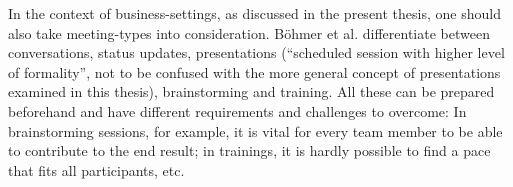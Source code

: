In the context of business-settings, as discussed in the present thesis, one should also take meeting-types into consideration. Böhmer et al. \cite{Bohmer:SmartphoneUseRude} differentiate between conversations, status updates, presentations (``scheduled session with higher level of formality'', not to be confused with the more general concept of presentations examined in this thesis), brainstorming and training. All these can be prepared beforehand and have different requirements and challenges to overcome: In brainstorming sessions, for example, it is vital for every team member to be able to contribute to the end result; in trainings, it is hardly possible to find a pace that fits all participants, etc.

